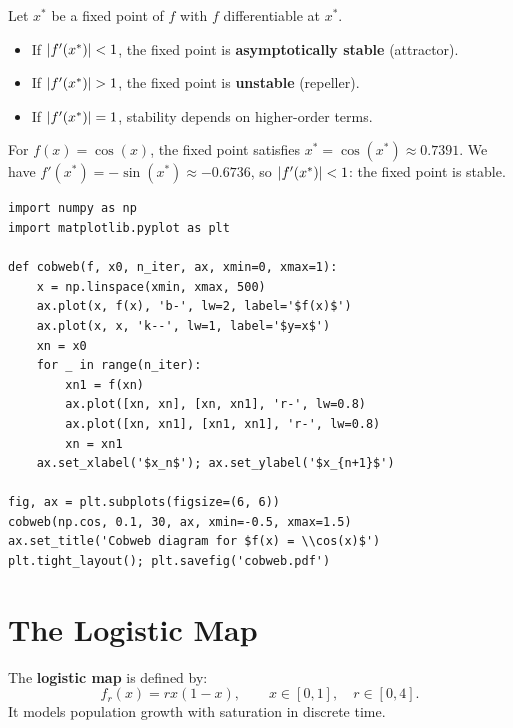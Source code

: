 \begin{theorem}
Let $x^*$ be a fixed point of $f$ with $f$ differentiable at $x^*$.
\begin{itemize}
  \item If $\left| f'(x^*) \right| < 1$, the fixed point is
    \textbf{asymptotically stable} (attractor).
  \item If $\left| f'(x^*) \right| > 1$, the fixed point is \textbf{unstable}
    (repeller).
  \item If $\left| f'(x^*) \right| = 1$, stability depends on higher-order
    terms.
\end{itemize}
\end{theorem}

\begin{example}
For $f(x)=\cos(x)$, the fixed point satisfies $x^*=\cos(x^*)
\approx 0.7391$.  We have $f'(x^*)=-\sin(x^*)\approx -0.6736$,
so $\left| f'(x^*) \right|<1$: the fixed point is stable.
\end{example}

\begin{codeblock}[title=\textbf{Cobweb diagram}]
\begin{verbatim}
import numpy as np
import matplotlib.pyplot as plt

def cobweb(f, x0, n_iter, ax, xmin=0, xmax=1):
    x = np.linspace(xmin, xmax, 500)
    ax.plot(x, f(x), 'b-', lw=2, label='$f(x)$')
    ax.plot(x, x, 'k--', lw=1, label='$y=x$')
    xn = x0
    for _ in range(n_iter):
        xn1 = f(xn)
        ax.plot([xn, xn], [xn, xn1], 'r-', lw=0.8)
        ax.plot([xn, xn1], [xn1, xn1], 'r-', lw=0.8)
        xn = xn1
    ax.set_xlabel('$x_n$'); ax.set_ylabel('$x_{n+1}$')

fig, ax = plt.subplots(figsize=(6, 6))
cobweb(np.cos, 0.1, 30, ax, xmin=-0.5, xmax=1.5)
ax.set_title('Cobweb diagram for $f(x) = \\cos(x)$')
plt.tight_layout(); plt.savefig('cobweb.pdf')
\end{verbatim}
\end{codeblock}

\section{The Logistic Map}
\label{sec:logistic_map}

\begin{definition}
The \textbf{logistic map} is defined by:
\[
  f_r(x) = rx(1-x), \qquad x\in[0,1], \quad r\in[0,4].
\]
It models population growth with saturation in discrete time.
\end{definition}

